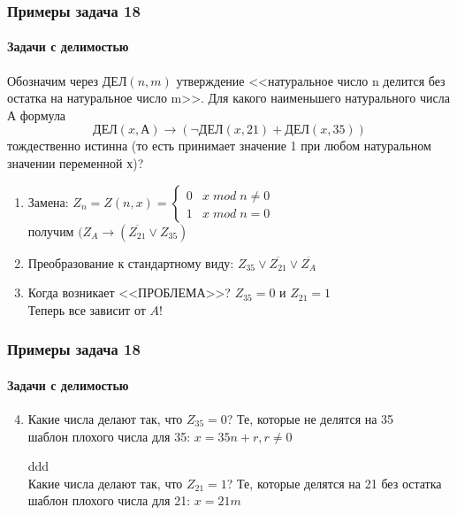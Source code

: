 \begin{frame}[t]
\frametitle{Примеры задача 18}
\framesubtitle{Задачи с делимостью}

Обозначим через $ДЕЛ(n, m)$ утверждение <<натуральное число n делится без остатка на натуральное число m>>. Для какого наименьшего натурального числа А формула
$$ДЕЛ(x, А) \rightarrow (\neg ДЕЛ(x, 21) + ДЕЛ(x, 35))$$
тождественно истинна (то есть принимает значение 1 при любом натуральном значении переменной х)? 

	\begin{enumerate}
		\item Замена: $Z_{n}=Z(n,x)=\begin{cases}
0 & x\;mod\;n\neq 0\\
1 & x\;mod\;n=0
\end{cases}$ \\
получим $(Z_{A} \rightarrow (\overline{Z_{21}} \vee Z_{35})$ 	\pause 
		\item Преобразование к стандартному виду: 
		$Z_{35} \vee \overline{Z_{21}} \vee \overline{Z_A}$ 	\pause 
		\item Когда возникает <<ПРОБЛЕМА>>? 
		      $Z_{35} =0$ и $Z_{21}=1$ \\Теперь все зависит от $A$!				
	\end{enumerate}	
\end{frame}


\begin{frame}[t]
\frametitle{Примеры задача 18}
\framesubtitle{Задачи с делимостью}
	\begin{enumerate}
	\setcounter{enumi}{3}
		\item 
		Какие числа делают так, что $Z_{35} =0$? Те, которые не делятся на 35\\
		шаблон плохого числа для 35: $x=35n+r, r \neq 0$\\ 	\pause 
		
		\textcolor[rgb]{1,1,1}{ddd}\\
		Какие числа делают так, что $Z_{21}=1$? Те, которые делятся на 21 без остатка\\
		шаблон плохого числа для 21: $x=21m$
								
	\end{enumerate}
	
	
\end{frame}


